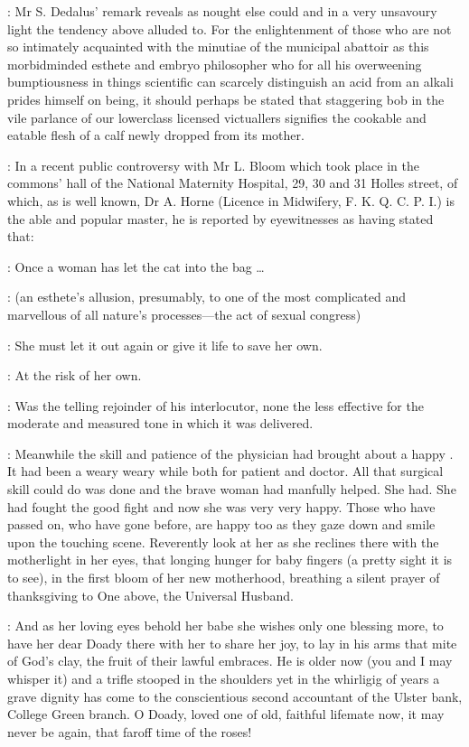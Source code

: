 : Mr S. Dedalus' remark reveals as
nought else could and in a very unsavoury light the tendency above
alluded to. For the enlightenment of those who are not so intimately
acquainted with the minutiae of the municipal abattoir as this
morbidminded esthete and embryo philosopher who for all his overweening
bumptiousness in things scientific can scarcely distinguish an acid from
an alkali prides himself on being, it should perhaps be stated that
staggering bob in the vile parlance of our lowerclass licensed
victuallers signifies the cookable and eatable flesh of a calf newly
dropped from its mother.

: In a recent public controversy with Mr L. Bloom
which took place in the commons' hall of the National
Maternity Hospital, 29, 30 and 31 Holles street, of which, as is well
known, Dr A. Horne (Licence in Midwifery, F. K. Q. C. P. I.) is the able and
popular master, he is reported by eyewitnesses as having stated that:

\stephen: Once a woman has let the cat into the bag \dots

: (an esthete's allusion, presumably,
to one of the most complicated and marvellous of all nature's processes---the
act of sexual congress)

\stephen: She must let it out again or give it life to save her own.

\Bloom: At the risk of her own.

: Was the telling rejoinder of his interlocutor, none the less
effective for the moderate and measured tone in which it was delivered.


: Meanwhile the skill and patience of the physician had brought about a
happy . It had been a weary weary while both for
patient and doctor. All that surgical skill could do was done and the
brave woman had manfully helped. She had. She had fought the good fight
and now she was very very happy. Those who have passed on, who have gone
before, are happy too as they gaze down and smile upon the touching scene.
Reverently look at her as she reclines there with the motherlight in her
eyes, that longing hunger for baby fingers (a pretty sight it is to see),
in the first bloom of her new motherhood, breathing a silent prayer of
thanksgiving to One above, the Universal Husband.

: And as her loving eyes behold her babe she wishes only one blessing
more, to have her dear Doady there with her to share her joy, to lay in
his arms that mite of God's clay, the fruit of their lawful embraces. He
is older now (you and I may whisper it) and a trifle stooped in the
shoulders yet in the whirligig of years a grave dignity has come to the
conscientious second accountant of the Ulster bank, College Green branch.
O Doady, loved one of old, faithful lifemate now, it may never be again,
that faroff time of the roses!

